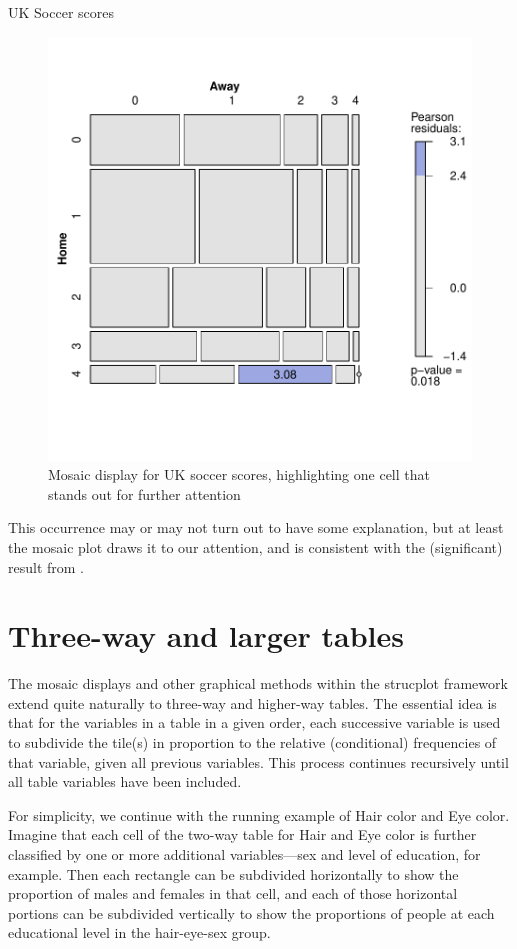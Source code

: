 \documentclass[10pt,krantz2]{krantz}\usepackage[]{graphicx}\usepackage[]{color}
\newenvironment{knitrout}{}{} %
\renewenvironment{knitrout}{\small\renewcommand{\baselinestretch}{.85}}{} %
\begin{document}
\begin{Example}[soccer2]{UK Soccer scores}
\begin{knitrout}
\begin{figure}[!htbp]
\centerline{\includegraphics[width=.6\textwidth]{ch05/fig/UKsoccer-mosaic-1} }

\caption[Mosaic display for UK soccer scores, highlighting one cell that stands out for further attention]{Mosaic display for UK soccer scores, highlighting one cell that stands out for further attention\label{fig:UKsoccer-mosaic}}
\end{figure}


\end{knitrout}
This occurrence may or may not turn out to have some explanation, but at least
the mosaic plot draws it to our attention, and is consistent with the
(significant) result from .
\end{Example}



\section{Three-way and larger tables}\label{sec:mosaic-threeway}


The mosaic displays and other graphical methods within the strucplot framework
extend quite naturally to three-way and higher-way tables.
The essential idea is that for the variables in a \mway table in a given order,
each successive variable is used to subdivide the tile(s) in proportion to
the relative (conditional) frequencies of that variable, given all previous
variables.  This process continues recursively until all table variables
have been included.

For simplicity, we continue with the running example of Hair color and Eye color.
Imagine that each
cell of the two-way table for Hair and Eye color is further
classified by one or more additional variables---sex and level of
education, for example.  Then each rectangle can be subdivided
horizontally to show the proportion of males and females in that
cell, and each of those horizontal portions can be subdivided
vertically to show the proportions of people at each educational
level in the hair-eye-sex group.
\end{document}
